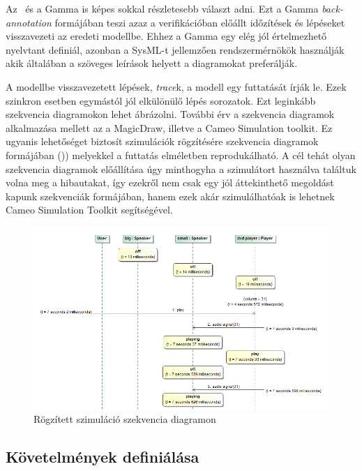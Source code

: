 Az \uppaal\ és a Gamma is képes sokkal részletesebb választ adni. Ezt a Gamma \emph{back-annotation} formájában teszi azaz a verifikációban előállt időzítések és lépéseket visszavezeti az eredeti modellbe. Ehhez a Gamma egy elég jól értelmezhető nyelvtant definiál, azonban a SysML-t jellemzően rendszermérnökök használják akik általában a szöveges leírások helyett a diagramokat preferálják.

A modellbe visszavezetett lépések, \emph{trace}k, a modell egy futtatását írják le. Ezek szinkron esetben egymástól jól elkülönülő lépés sorozatok. Ezt leginkább szekvencia diagramokon lehet ábrázolni. További érv a szekvencia diagramok alkalmazása mellett az a MagicDraw, illetve a Cameo Simulation toolkit. Ez ugyanis lehetőséget biztosít szimulációk rögzítésére szekvencia diagramok formájában ()) melyekkel a futtatás elméletben reprodukálható. A cél tehát olyan szekvencia diagramok előállítása úgy minthogyha a szimulátort használva találtuk volna meg a hibautakat, így ezekről nem csak egy jól áttekinthető megoldást kapunk szekvenciák formájában, hanem ezek akár szimulálhatóak is lehetnek Cameo Simulation Toolkit segítségével.

\begin{figure}[!ht]
	\centering
	\includegraphics[width=120mm, keepaspectratio]{figures/contribution/md-cameo-rec.png}
	\caption[]{Rögzített szimuláció szekvencia diagramon\footnotemark}
	\label{fig:md-cameo-rec}
\end{figure}


\subsection{Követelmények definiálása}

